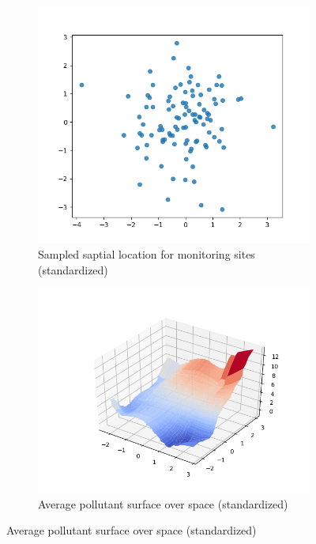 \documentclass[11pt]{article}
\theoremstyle{definition}
\begin{document}
\begin{figure}[!ht]
\begin{subfigure}{.5\textwidth}
  \centering
  \includegraphics[width=.8\linewidth]{"./plot/loc_site"}
  \caption{Sampled saptial location for monitoring sites (standardized)}
  \label{fig:sfig1}
\end{subfigure}%
\begin{subfigure}{.5\textwidth}
  \centering
  \includegraphics[width=\linewidth]{"./plot/y_surface"}
  \caption{Average pollutant surface over space (standardized)}
  \label{fig:sfig2}
\end{subfigure}
\label{fig:fig}
\end{figure}
\end{document}
